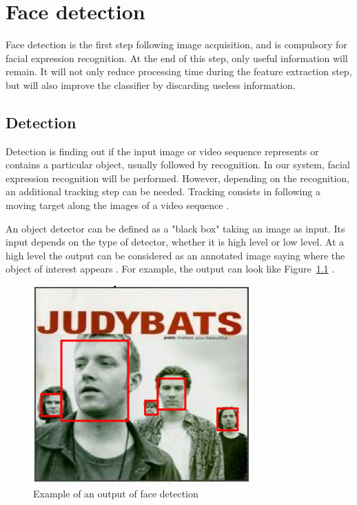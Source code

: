\chapter{Face detection}

\noindent Face detection is the first step following image acquisition, and is compulsory for facial expression recognition. At the end of this step, only useful information will remain. It will not only reduce processing time during the feature extraction step, but will also improve the classifier by discarding useless information.
\newline

\section{Detection}

\vspace{\baselineskip}
\noindent Detection is finding out if the input image or video sequence represents or contains a particular object, usually followed by recognition. In our system, facial expression recognition will be performed. However, depending on the recognition, an additional tracking step can be needed. Tracking consists in following a moving target along the images of a video sequence \cite{DIN08}.
\newline

\noindent An object detector can be defined as a "black box" taking an image as input. Its input depends on the type of detector, whether it is high level or low level. At a high level the output can be considered as an annotated image saying where the object of interest appears \cite{DIN08}. For example, the output can look like Figure~\ref{output_example_face_detection} \cite{DIN08}.
\newline

\begin{figure}[!h]
\begin{center}
\noindent \includegraphics[scale=0.7]{figures/output_example_face_detection} 
\newline
\caption{Example of an output of face detection}
\label{output_example_face_detection}
\end{center} 
\end{figure}

